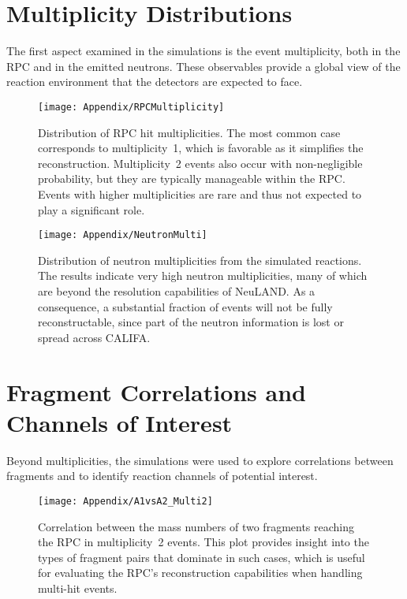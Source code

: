 \section{Multiplicity Distributions}

The first aspect examined in the simulations is the event multiplicity, both in the \gls{RPC} and in the emitted neutrons. These observables provide a global view of the reaction environment that the detectors are expected to face.

\begin{figure}[htbp]
	\centering
	\texttt{[image: Appendix/RPCMultiplicity]}
	\caption[RPC hit multiplicity distribution]{Distribution of \gls{RPC} hit multiplicities. The most common case corresponds to multiplicity~1, which is favorable as it simplifies the reconstruction. Multiplicity~2 events also occur with non-negligible probability, but they are typically manageable within the \gls{RPC}. Events with higher multiplicities are rare and thus not expected to play a significant role.}
	\label{fig:rpc_multiplicity}
\end{figure}

\begin{figure}[htbp]
	\centering
	\texttt{[image: Appendix/NeutronMulti]}
	\caption[Neutron multiplicity distribution]{Distribution of neutron multiplicities from the simulated reactions. The results indicate very high neutron multiplicities, many of which are beyond the resolution capabilities of NeuLAND. As a consequence, a substantial fraction of events will not be fully reconstructable, since part of the neutron information is lost or spread across CALIFA.}
	\label{fig:neutron_multiplicity}
\end{figure}

\section{Fragment Correlations and Channels of Interest}

Beyond multiplicities, the simulations were used to explore correlations between fragments and to identify reaction channels of potential interest.  

\begin{figure}[htbp]
	\centering
	\texttt{[image: Appendix/A1vsA2\_Multi2]}
	\caption[Correlation of fragment masses in RPC multiplicity-2 events]{Correlation between the mass numbers of two fragments reaching the \gls{RPC} in multiplicity~2 events. This plot provides insight into the types of fragment pairs that dominate in such cases, which is useful for evaluating the \gls{RPC}’s reconstruction capabilities when handling multi-hit events.}
	\label{fig:a1_a2}
\end{figure}


